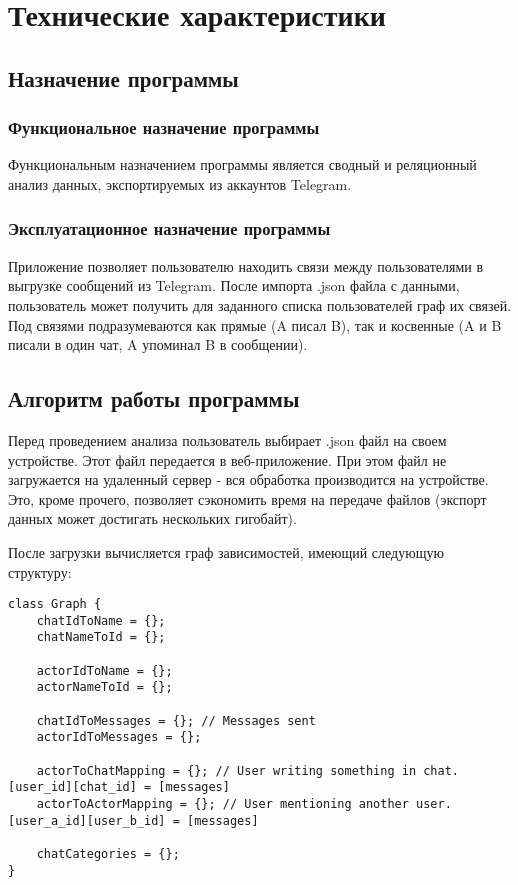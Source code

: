 \section{Технические характеристики}

\subsection{Назначение программы}

\subsubsection{Функциональное назначение программы}

Функциональным назначением программы является сводный и реляционный анализ данных, экспортируемых из аккаунтов Telegram.

\subsubsection{Эксплуатационное назначение программы}

Приложение позволяет пользователю находить связи между пользователями в выгрузке сообщений из Telegram.
После импорта .json файла с данными, пользователь может получить для заданного списка пользователей граф их связей.
Под связями подразумеваются как прямые (A писал B), так и косвенные (A и B писали в один чат, A упоминал B в сообщении).

\subsection{Алгоритм работы программы}

Перед проведением анализа пользователь выбирает .json файл на своем устройстве. Этот файл передается в веб-приложение.
При этом файл не загружается на удаленный сервер - вся обработка производится на устройстве. 
Это, кроме прочего, позволяет сэкономить время на передаче файлов (экспорт данных может достигать нескольких гигобайт).

После загрузки вычисляется граф зависимостей, имеющий следующую структуру:

\begin{lstlisting}
class Graph {
    chatIdToName = {};
    chatNameToId = {};

    actorIdToName = {};
    actorNameToId = {};

    chatIdToMessages = {}; // Messages sent
    actorIdToMessages = {};

    actorToChatMapping = {}; // User writing something in chat. [user_id][chat_id] = [messages]
    actorToActorMapping = {}; // User mentioning another user. [user_a_id][user_b_id] = [messages]

    chatCategories = {};
}
\end{lstlisting}

